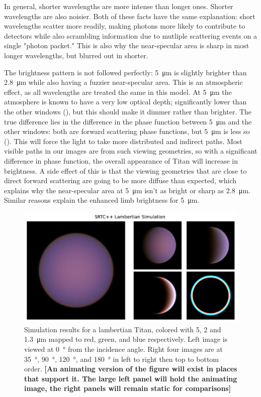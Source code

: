 \documentclass{article}
\begin{document}
In general, shorter wavelengths are more intense than longer ones. Shorter wavelengths are also noisier. Both of these facts have the same explanation: short wavelengths scatter more readily, making photons more likely to contribute to detectors while also scrambling information due to mutliple scattering events on a single "photon packet." This is also why the near-specular area is sharp in most longer wavelengths, but blurred out in shorter.

The brightness pattern is not followed perfectly: \qty{5}{\micro\meter} is slightly brighter than \qty{2.8}{\micro\meter} while also having a fuzzier near-specular area. This is an atmospheric effect, as all wavelengths are treated the same in this model. At \qty{5}{\micro\meter} the atmosphere is known to have a very low optical depth; significantly lower than the other windows (\cite{EsSayeh2023}), but this should make it dimmer rather than brighter. The true difference lies in the difference in the phase function between \qty{5}{\micro\meter} and the other windows: both are forward scattering phase functions, but \qty{5}{\micro\meter} is less so (\cite{Tomasko2008}). This will force the light to take more distributed and indirect paths. Most visible paths in our images are from such viewing geometries, so with a significant difference in phase function, the overall appearance of Titan will increase in brightness. A side effect of this is that the viewing geometries that are close to direct forward scattering are going to be more diffuse than expected, which explains why the near-specular area at \qty{5}{\micro\meter} isn't as bright or sharp as \qty{2.8}{\micro\meter}. Similar reasons explain the enhanced limb brightness for \qty{5}{\micro\meter}.

\begin{figure}[htbp]
\includegraphics[scale = 0.5]{LambertianSim.pdf}
\centering
\caption{Simulation results for a lambertian Titan, colored with 5, 2 and \qty{1.3}{\micro\meter} mapped to red, green, and blue respectively. Left image is viewed at \qty{0}{\degree} from the incidence angle. Right four images are at  \qty{35}{\degree},  \qty{90}{\degree},  \qty{120}{\degree}, and  \qty{180}{\degree} in left to right then top to bottom order. \textbf{\color{red} [An animating version of the figure will exist in places that support it. The large left panel will hold the animating image, the right panels will remain static for comparisons] \color{black}}}
\label{fig:9}
\end{figure}
\end{document}

